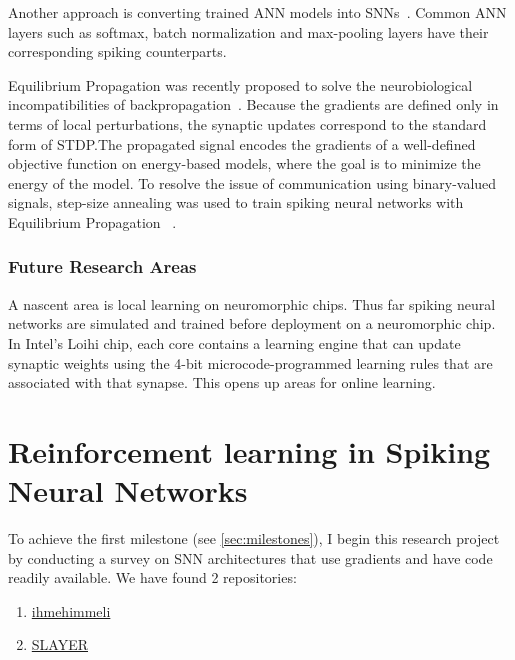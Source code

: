 \documentclass[fyp]{socreport}
\begin{document}
Another approach is converting trained ANN models into
SNNs~\cite{rueckauer16_theor_tools_conver_analog_to}. Common ANN layers such as
softmax, batch normalization and max-pooling layers have their corresponding
spiking counterparts.

Equilibrium Propagation was recently proposed to solve the neurobiological
incompatibilities of backpropagation~\cite{10.3389/fncom.2017.00024}. Because
the gradients are defined only in terms of local perturbations, the synaptic
updates correspond to the standard form of STDP.\@ The propagated signal encodes
the gradients of a well-defined objective function on energy-based models, where
the goal is to minimize the energy of the model. To resolve the issue of
communication using binary-valued signals, step-size annealing was used to train
spiking neural networks with Equilibrium Propagation
~\cite{pmlr-v89-o-connor19a}.

\subsection{Future Research Areas\label{sec:future-rese-areas}}

A nascent area is local learning on neuromorphic chips. Thus far spiking neural
networks are simulated and trained before deployment on a neuromorphic chip. In
Intel's Loihi chip, each core contains a learning engine that can update
synaptic weights using the 4-bit microcode-programmed learning rules that are
associated with that synapse. This opens up areas for online learning.

\chapter{Reinforcement learning in Spiking Neural Networks\label{cha:snnrl}}

To achieve the first milestone (see \autoref{sec:milestones}), I begin this
research project by conducting a survey on SNN architectures that use gradients
and have code readily available. We have found 2 repositories:

\begin{enumerate}
\item
\href{https://github.com/google/ihmehimmeli}{ihmehimmeli}~\cite{comsa19_tempor_codin_spikin_neural_networ}
\item
\href{https://github.com/bamsumit/slayerPytorch/}{SLAYER}~\cite{NIPS2018_7415}
\end{enumerate}
\end{document}
